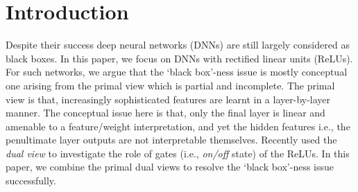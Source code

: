 \section{Introduction}
Despite their success deep neural networks (DNNs) are still largely considered as black boxes. In this paper, we focus on DNNs with rectified linear units (ReLUs). For such networks, we argue that the `black box'-ness issue is mostly conceptual one arising from the primal view which is partial and incomplete. The primal view is that, increasingly sophisticated features are learnt in a layer-by-layer manner. The conceptual issue here is that, only the final layer is linear and amenable to a feature/weight interpretation, and yet the hidden features i.e., the penultimate layer outputs are not interpretable themselves. 
Recently \cite{npk} used the \emph{dual view} to investigate the role of gates (i.e., \emph{on/off} state) of the ReLUs. In this paper, we combine the primal dual views to resolve the `black box'-ness issue successfully.


